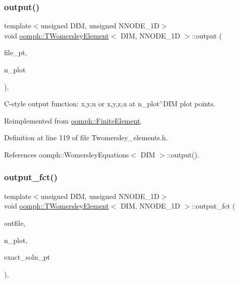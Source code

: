 \subsubsection{\texorpdfstring{output()}{output()}\hspace{0.1cm}{\footnotesize\ttfamily [4/4]}}
{\footnotesize\ttfamily template$<$unsigned D\+IM, unsigned N\+N\+O\+D\+E\+\_\+1D$>$ \\
void \hyperlink{classoomph_1_1TWomersleyElement}{oomph\+::\+T\+Womersley\+Element}$<$ D\+IM, N\+N\+O\+D\+E\+\_\+1D $>$\+::output (\begin{DoxyParamCaption}\item[{F\+I\+LE $\ast$}]{file\+\_\+pt,  }\item[{const unsigned \&}]{n\+\_\+plot }\end{DoxyParamCaption})\hspace{0.3cm}{\ttfamily [inline]}, {\ttfamily [virtual]}}



C-\/style output function\+: x,y,u or x,y,z,u at n\+\_\+plot$^\wedge$\+D\+IM plot points. 



Reimplemented from \hyperlink{classoomph_1_1FiniteElement_adfaee690bb0608f03320eeb9d110d48c}{oomph\+::\+Finite\+Element}.



Definition at line 119 of file Twomersley\+\_\+elements.\+h.



References oomph\+::\+Womersley\+Equations$<$ D\+I\+M $>$\+::output().

\mbox{\label{classoomph_1_1TWomersleyElement_ad72387529709878cf5778881b2ced002}} 
\subsubsection{\texorpdfstring{output\+\_\+fct()}{output\_fct()}\hspace{0.1cm}{\footnotesize\ttfamily [1/2]}}
{\footnotesize\ttfamily template$<$unsigned D\+IM, unsigned N\+N\+O\+D\+E\+\_\+1D$>$ \\
void \hyperlink{classoomph_1_1TWomersleyElement}{oomph\+::\+T\+Womersley\+Element}$<$ D\+IM, N\+N\+O\+D\+E\+\_\+1D $>$\+::output\+\_\+fct (\begin{DoxyParamCaption}\item[{std\+::ostream \&}]{outfile,  }\item[{const unsigned \&}]{n\+\_\+plot,  }\item[{\hyperlink{classoomph_1_1FiniteElement_a690fd33af26cc3e84f39bba6d5a85202}{Finite\+Element\+::\+Steady\+Exact\+Solution\+Fct\+Pt}}]{exact\+\_\+soln\+\_\+pt }\end{DoxyParamCaption})\hspace{0.3cm}{\ttfamily [inline]}, {\ttfamily [virtual]}}



